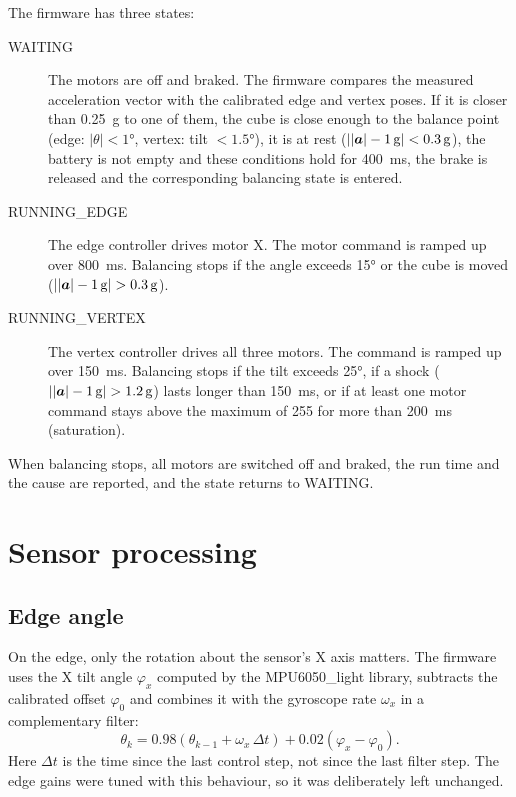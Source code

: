 The firmware has three states:
\begin{description}
  \item[WAITING] The motors are off and braked. The firmware compares the measured acceleration
    vector with the calibrated edge and vertex poses. If it is closer than \SI{0.25}{g} to one of
    them, the cube is close enough to the balance point (edge: $|\theta| < \ang{1}$, vertex:
    tilt $< \ang{1.5}$), it is at rest ($\left||\bm{a}| - \SI{1}{g}\right| < \SI{0.3}{g}$), the
    battery is not empty and these conditions hold for \SI{400}{ms}, the brake is released and the
    corresponding balancing state is entered.
  \item[RUNNING\_EDGE] The edge controller drives motor X. The motor command is ramped up over
    \SI{800}{ms}. Balancing stops if the angle exceeds \ang{15} or the cube is moved
    ($\left||\bm{a}| - \SI{1}{g}\right| > \SI{0.3}{g}$).
  \item[RUNNING\_VERTEX] The vertex controller drives all three motors. The command is ramped up
    over \SI{150}{ms}. Balancing stops if the tilt exceeds \ang{25}, if a shock
    ($\left||\bm{a}| - \SI{1}{g}\right| > \SI{1.2}{g}$) lasts longer than \SI{150}{ms}, or if at
    least one motor command stays above the maximum of 255 for more than \SI{200}{ms}
    (saturation).
\end{description}
When balancing stops, all motors are switched off and braked, the run time and the cause are
reported, and the state returns to WAITING.

\section{Sensor processing}
\label{sec:sensor_processing}

\subsection{Edge angle}

On the edge, only the rotation about the sensor's X axis matters. The firmware uses the X tilt
angle $\varphi_x$ computed by the MPU6050\_light library, subtracts the calibrated offset
$\varphi_0$ and combines it with the gyroscope rate $\omega_x$ in a complementary filter:
\begin{equation}
  \theta_k = 0.98\left(\theta_{k-1} + \omega_x\,\Delta t\right) + 0.02\left(\varphi_x - \varphi_0\right).
  \label{eq:edge_cf}
\end{equation}
Here $\Delta t$ is the time since the last control step, not since the last filter step. The edge
gains were tuned with this behaviour, so it was deliberately left unchanged.

